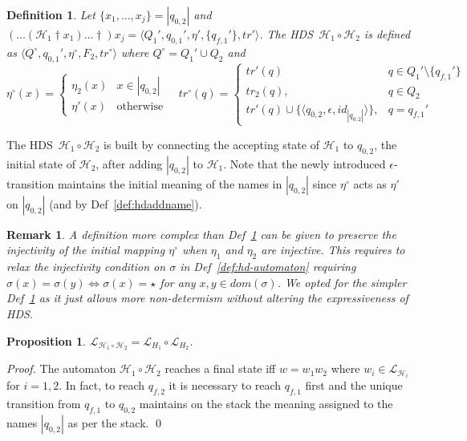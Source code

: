 \documentclass[runningheads,a4paper]{llncs}
\newcommand{\longversion}[1]{#1}
\newcommand{\addname}[2]{#1 \dag  #2}
\newcommand{\trans}{\mathit{tr}}
\newcommand{\emptystr}{\epsilon}
\newcommand{\lang}[1]{\mathcal{L}_{#1}}
\newcommand{\fresh}{\star}
\newcommand{\weight}[1]{|#1|}
\newcommand{\hdns}{HDS}
\newtheorem{definition}{Theorem}[section]
\newtheorem{proposition}{Theorem}[section]
\newtheorem{remark}{Theorem}[section]
\newtheorem{definition}{Definition}[section]
\newtheorem{proposition}{Proposition}[section]
\newtheorem{remark}{Remark}[section]
\newcommand{\dom}[1]{\mathit{dom}(#1)}
\newcommand{\tuple}[1]{\langle#1\rangle}
\newcommand{\hdtr}[3]{\tuple{#2,#1,#3}}
\begin{document}
\begin{definition}\label{def:hdcomp}
  Let $\{x_1,\ldots,x_j\} = \weight{q_{0,2}}$ and
  $\addname{(\ldots(\addname{\mathcal H_1}{x_1})\ldots}{)x_j} =
  \tuple{Q_1',q_{0,1}',\eta', \{q_{f,1}'\}, \trans'}$.
The \hdns\ $\mathcal H_1 \circ \mathcal H_2$ is defined as
  $\tuple{Q^\circ,q_{0,1}',\eta^\circ, F_2, \trans^\circ}$ where
  $Q^\circ = Q_1' \cup Q_2$ and
  \[
  \eta^\circ(x) =
  \begin{cases}
   \eta_2(x) & x \in \weight{q_{0,2}}
   \\
   \eta'(x) & \text{otherwise}
  \end{cases}
  \quad
  \trans^\circ(q) = \begin{cases}
    \trans'(q) & q \in Q_1' \setminus \{q_{f,1}'\}
    \\
    \trans_2(q), & q \in Q_2
    \\
    \trans'(q) \cup \{\hdtr \emptystr {q_{0,2}} {id_{\weight{q_{0,2}}}} \},
    & q = q_{f,1}'
  \end{cases}
   \]
\end{definition}
The \hdns\ ${\mathcal H}_1 \circ {\mathcal H}_2$ is built by
connecting the accepting state of ${\mathcal H}_1$ to $q_{0,2}$, the
initial state of ${\mathcal H}_2$, after adding $\weight{q_{0,2}}$ to
${\mathcal H}_1$.
Note that the newly introduced $\emptystr$-transition maintains the
initial meaning of the names in $\weight{q_{0,2}}$ since $\eta^\circ$
acts as $\eta'$ on $\weight{q_{0,2}}$ (and by
Def~\ref{def:hdaddname}).
\begin{remark}\label{rmk:eta}
  A definition more complex than Def~\ref{def:hdcomp} can be given to
  preserve the injectivity of the initial mapping $\eta^\circ$ when
  $\eta_1$ and $\eta_2$ are injective.
This requires to relax the injectivity condition on $\sigma$ in
  Def~\ref{def:hd-automaton} requiring $\sigma(x) = \sigma(y) \iff
  \sigma(x) = \fresh$ for any $x, y \in \dom \sigma$.
We opted for the simpler Def~\ref{def:hdcomp} as it just allows more
  non-determism without altering the expressiveness of \hdns.
\end{remark}
\begin{proposition}\label{prop:H1H2}
  $\lang{\mathcal H_1 \circ \mathcal H_2} = \lang{H_1} \circ \lang{H_2}$.
\end{proposition}
\longversion{
  \begin{proof}
    The automaton $\mathcal H_1 \circ \mathcal H_2$ reaches a final
    state iff $w = w_1w_2$ where $w_i \in \lang{\mathcal H_i}$ for
    $i=1,2$.
In fact, to reach $q_{f,2}$ it is necessary to reach $q_{f,1}$
    first and the unique transition from $q_{f,1}$ to $q_{0,2}$
    maintains on the stack the meaning assigned to the names
    $\weight{q_{0,2}}$ as per the stack.
\qed
  \end{proof}
}
\end{document}
